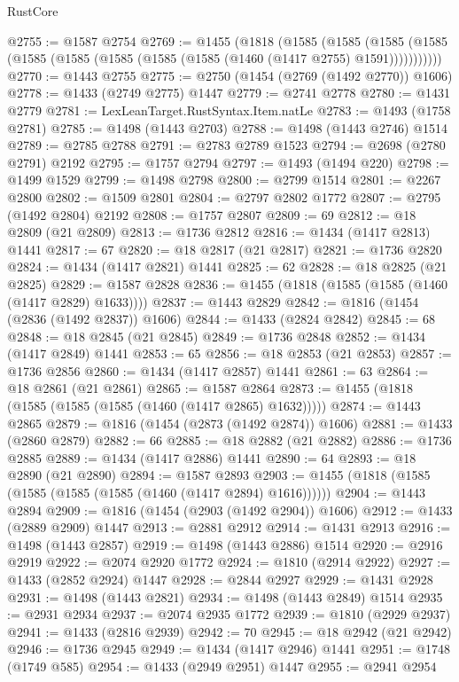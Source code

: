 \begin{lexlean}{RustCore}
\begin{coremodule}
@2755 := @1587 @2754
@2769 := @1455
    (@1818
      (@1585
        (@1585
          (@1585 (@1585 (@1585 (@1585 (@1585 (@1585 (@1585 (@1460 (@1417 @2755) @1591)))))))))))
@2770 := @1443 @2755
@2775 := @2750 (@1454 (@2769 (@1492 @2770)) @1606)
@2778 := @1433 (@2749 @2775) @1447
@2779 := @2741 @2778
@2780 := @1431 @2779
@2781 := LexLeanTarget.RustSyntax.Item.natLe
@2783 := @1493 (@1758 @2781)
@2785 := @1498 (@1443 @2703)
@2788 := @1498 (@1443 @2746) @1514
@2789 := @2785 @2788
@2791 := @2783 @2789 @1523
@2794 := @2698 (@2780 @2791) @2192
@2795 := @1757 @2794
@2797 := @1493 (@1494 @220)
@2798 := @1499 @1529
@2799 := @1498 @2798
@2800 := @2799 @1514
@2801 := @2267 @2800
@2802 := @1509 @2801
@2804 := @2797 @2802 @1772
@2807 := @2795 (@1492 @2804) @2192
@2808 := @1757 @2807
@2809 := 69
@2812 := @18 @2809 (@21 @2809)
@2813 := @1736 @2812
@2816 := @1434 (@1417 @2813) @1441
@2817 := 67
@2820 := @18 @2817 (@21 @2817)
@2821 := @1736 @2820
@2824 := @1434 (@1417 @2821) @1441
@2825 := 62
@2828 := @18 @2825 (@21 @2825)
@2829 := @1587 @2828
@2836 := @1455 (@1818 (@1585 (@1585 (@1460 (@1417 @2829) @1633))))
@2837 := @1443 @2829
@2842 := @1816 (@1454 (@2836 (@1492 @2837)) @1606)
@2844 := @1433 (@2824 @2842)
@2845 := 68
@2848 := @18 @2845 (@21 @2845)
@2849 := @1736 @2848
@2852 := @1434 (@1417 @2849) @1441
@2853 := 65
@2856 := @18 @2853 (@21 @2853)
@2857 := @1736 @2856
@2860 := @1434 (@1417 @2857) @1441
@2861 := 63
@2864 := @18 @2861 (@21 @2861)
@2865 := @1587 @2864
@2873 := @1455 (@1818 (@1585 (@1585 (@1585 (@1460 (@1417 @2865) @1632)))))
@2874 := @1443 @2865
@2879 := @1816 (@1454 (@2873 (@1492 @2874)) @1606)
@2881 := @1433 (@2860 @2879)
@2882 := 66
@2885 := @18 @2882 (@21 @2882)
@2886 := @1736 @2885
@2889 := @1434 (@1417 @2886) @1441
@2890 := 64
@2893 := @18 @2890 (@21 @2890)
@2894 := @1587 @2893
@2903 := @1455 (@1818 (@1585 (@1585 (@1585 (@1585 (@1460 (@1417 @2894) @1616))))))
@2904 := @1443 @2894
@2909 := @1816 (@1454 (@2903 (@1492 @2904)) @1606)
@2912 := @1433 (@2889 @2909) @1447
@2913 := @2881 @2912
@2914 := @1431 @2913
@2916 := @1498 (@1443 @2857)
@2919 := @1498 (@1443 @2886) @1514
@2920 := @2916 @2919
@2922 := @2074 @2920 @1772
@2924 := @1810 (@2914 @2922)
@2927 := @1433 (@2852 @2924) @1447
@2928 := @2844 @2927
@2929 := @1431 @2928
@2931 := @1498 (@1443 @2821)
@2934 := @1498 (@1443 @2849) @1514
@2935 := @2931 @2934
@2937 := @2074 @2935 @1772
@2939 := @1810 (@2929 @2937)
@2941 := @1433 (@2816 @2939)
@2942 := 70
@2945 := @18 @2942 (@21 @2942)
@2946 := @1736 @2945
@2949 := @1434 (@1417 @2946) @1441
@2951 := @1748 (@1749 @585)
@2954 := @1433 (@2949 @2951) @1447
@2955 := @2941 @2954

\end{coremodule}
\end{lexlean}
